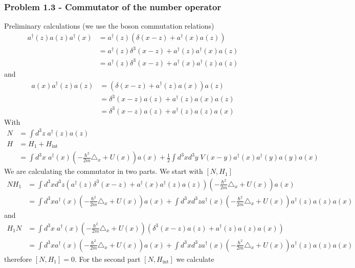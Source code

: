 \documentclass[10pt,a4paper]{article}
\theoremstyle{definition}
\begin{document}
\subsubsection{Problem 1.3 - Commutator of the number operator}
Preliminary calculations (we use the boson commutation relations)
\begin{align}
a^\dagger(z)a(z)a^\dagger(x)&=a^\dagger(z)(\delta(x-z)+a^\dagger(x)a(z))\\
&=a^\dagger(z)\delta^3(x-z)+a^\dagger(z)a^\dagger(x)a(z)\\
&=a^\dagger(z)\delta^3(x-z)+a^\dagger(x)a^\dagger(z)a(z)
\end{align}
and
\begin{align}
a(x)a^\dagger(z)a(z)&=(\delta(x-z)+a^\dagger(z)a(x))a(z)\\
&=\delta^3(x-z)a(z)+a^\dagger(z)a(x)a(z)\\
&=\delta^3(x-z)a(z)+a^\dagger(z)a(z)a(x)
\end{align}
With
\begin{align}
N&=\int d^3z\; a^\dagger(z)a(z)\\
H&=H_1+H_\text{int}\\
&=\int d^3x\; a^\dagger(x)\left(-\frac{\hbar^2}{2m}\triangle_x+U(x)\right)a(x)+\frac{1}{2}\int d^3xd^3y\;V(x-y) a^\dagger(x)a^\dagger(y)a(y)a(x)
\end{align}
We are calculating the commutator in two parts. We start with $[N,H_1]$
\begin{align}
N H_1&=\int d^3xd^3z\left(a^\dagger(z)\delta^3(x-z)+a^\dagger(x)a^\dagger(z)a(z)\right)\left(-\frac{\hbar^2}{2m}\triangle_x+U(x)\right)a(x)\\
&=\int d^3xa^\dagger(x)\left(-\frac{\hbar^2}{2m}\triangle_x+U(x)\right)a(x)+\int d^3xd^3za^\dagger(x)\left(-\frac{\hbar^2}{2m}\triangle_x+U(x)\right)a^\dagger(z)a(z)a(x)
\end{align}
and
\begin{align}
H_1N&=\int d^3x\; a^\dagger(x)\left(-\frac{\hbar^2}{2m}\triangle_x+U(x)\right)(\delta^3(x-z)a(z)+a^\dagger(z)a(z)a(x))\\
&=\int d^3xa^\dagger(x)\left(-\frac{\hbar^2}{2m}\triangle_x+U(x)\right)a(x)+\int d^3xd^3za^\dagger(x)\left(-\frac{\hbar^2}{2m}\triangle_x+U(x)\right)a^\dagger(z)a(z)a(x)
\end{align}
therefore $[N,H_1]=0$.
For the second part $[N,H_\text{int}]$ we calculate
\end{document}
